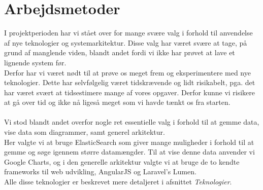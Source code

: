 \section{Arbejdsmetoder}
I projektperioden har vi stået over for mange svære valg i forhold til anvendelse af nye teknologier og systemarkitektur.
Disse valg har været svære at tage, på grund af manglende viden, blandt andet fordi vi ikke har prøvet at lave et lignende system før.
\\
Derfor har vi været nødt til at prøve os meget frem og eksperimentere med nye teknologier. Dette har selvfølgelig været tidskrævende og
lidt risikabelt, pga. det har været svært at tidsestimere mange af vores opgaver. Derfor kunne vi risikere at gå over tid og ikke nå
ligeså meget som vi havde tænkt os fra starten.
\\\\
Vi stod blandt andet overfor nogle ret essentielle valg i forhold til at gemme data, vise data som diagrammer, samt generel arkitektur.
\\
Her valgte vi at bruge ElasticSearch som giver mange muligheder i forhold til at gemme og søge igennem større datamængder. Til at vise
denne data anvender vi Google Charts, og i den generelle arkitektur valgte vi at bruge de to kendte frameworks til web udvikling, AngularJS og Laravel's Lumen.
\\
Alle disse teknologier er beskrevet mere detaljeret i afsnittet \textit{Teknologier}.
